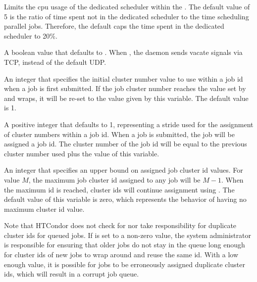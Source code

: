 \begin{description}
\label{param:DedicatedSchedulerDelayFactor}
\item[\Macro{DEDICATED\_SCHEDULER\_DELAY\_FACTOR}]
  Limits the cpu usage of the dedicated scheduler within the .
  The default value of 5 is the ratio of time spent not in 
  the dedicated scheduler to the time scheduling parallel jobs.
  Therefore, the default caps the time spent in the dedicated scheduler
  to 20\%.

\label{param:ScheddSendVacateViaTcp}
\item[\Macro{SCHEDD\_SEND\_VACATE\_VIA\_TCP}]
  A boolean value that defaults to .
  When , the  daemon sends vacate signals via TCP,
  instead of the default UDP.

\label{param:ScheddClusterInitialValue}
\item[\Macro{SCHEDD\_CLUSTER\_INITIAL\_VALUE}]
  An integer that specifies the initial cluster number value to use within a
  job id when a job is first submitted.
  If the job cluster number reaches the value set by 
   and wraps,
  it will be re-set to the value given by this variable.
  The default value is 1.

\label{param:ScheddClusterIncrementValue}
\item[\Macro{SCHEDD\_CLUSTER\_INCREMENT\_VALUE}]
  A positive integer that defaults to 1, representing a stride used
  for the assignment of cluster numbers within a job id.
  When a job is submitted, the job will be assigned a job id.  The cluster
  number of the job id will be equal to the previous cluster number used
  plus the value of this variable.

\label{param:ScheddClusterMaximumValue}
\item[\Macro{SCHEDD\_CLUSTER\_MAXIMUM\_VALUE}]
  An integer that specifies an upper bound on assigned job cluster id values.
  For value $M$, the maximum job cluster id assigned to 
  any job will be $M-1$. When the maximum id is reached, cluster ids will 
  continue assignment using . The 
  default value of this variable is zero,
  which represents the behavior of having no maximum cluster id value. 

  Note that HTCondor does not check for nor take responsibility for duplicate
  cluster ids for queued jobs. 
  If  is set to a non-zero value,
  the system administrator is
  responsible for ensuring that older jobs do not stay in the queue long
  enough for cluster ids of new jobs to wrap around and reuse the same id.
  With a low enough value, it is possible for jobs to be erroneously assigned 
  duplicate cluster ids, which will result in a corrupt job queue.


\end{description}
